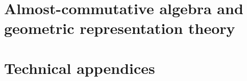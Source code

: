 	    
	    
    \part{Almost-commutative algebra and geometric representation theory}
        
        
        
    
        
        
        
    
        
	
	\part{Technical appendices}
        \begin{appendices}
            
        
            
            
            
            
            
        \end{appendices}
	
	\printbibliography
	
	\printindex

